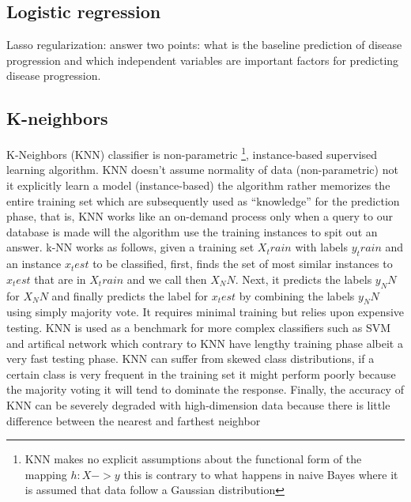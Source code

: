 \documentclass[12pt]{report}
\begin{document}
\subsection{Logistic regression}

Lasso regularization: answer two points: what is the baseline prediction of disease progression and  which independent variables are important factors for predicting disease progression.

\subsection{K-neighbors}
K-Neighbors (KNN) classifier is non-parametric \footnote{KNN makes no explicit assumptions about the functional form of the mapping $h:X->y$ this is contrary to what happens in naive Bayes where it is assumed that data follow a Gaussian distribution}, instance-based supervised learning algorithm. KNN doesn't assume normality of data (non-parametric) not it explicitly learn a model (instance-based) the algorithm rather memorizes the entire training set which are subsequently used as “knowledge” for the prediction phase, that is, KNN works like an on-demand process only when a query to our database is made will the algorithm use the training instances to spit out an answer. 
k-NN works as follows, given a training set $X_train$ with labels $y_train$ and an instance $x_test$ to be classified, first, finds the set of most similar instances to $x_test$ that are in $X_train$ and we call then $X_NN$. Next, it predicts the labels $y_NN$ for $X_NN$ and finally predicts the label for $x_test$ by combining the labels $y_NN$ using simply majority vote. 
It requires minimal training but relies upon expensive testing. KNN is used as a benchmark for more complex classifiers such as SVM and artifical network which contrary to KNN have lengthy training phase albeit a very fast testing phase. KNN can suffer from skewed class distributions, if a certain class is very frequent in the training set it might perform poorly because the majority voting 
it will tend to dominate the response. Finally, the accuracy of KNN can be severely degraded with high-dimension data because there is little difference between the nearest and farthest neighbor
\end{document}
